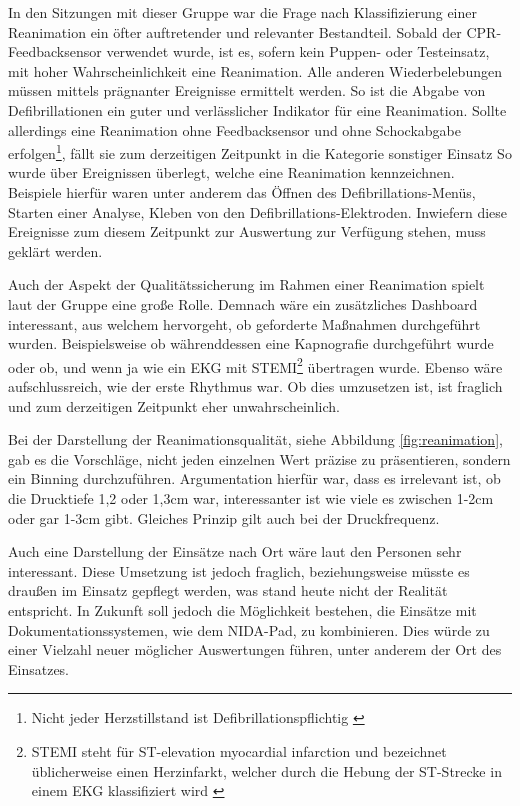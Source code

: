 In den Sitzungen mit dieser Gruppe war die Frage nach Klassifizierung einer Reanimation ein öfter auftretender und relevanter Bestandteil.
Sobald der \gls{CPR-Feedbacksensor} verwendet wurde, ist es, sofern kein Puppen- oder Testeinsatz, mit hoher Wahrscheinlichkeit eine Reanimation.
Alle anderen Wiederbelebungen müssen mittels prägnanter Ereignisse ermittelt werden. 
So ist die Abgabe von Defibrillationen ein guter und verlässlicher Indikator für eine Reanimation.
Sollte allerdings eine Reanimation ohne Feedbacksensor und ohne Schockabgabe erfolgen\footnote{Nicht jeder Herzstillstand ist Defibrillationspflichtig \cite{Nolan.2010}}, fällt sie zum derzeitigen Zeitpunkt in die Kategorie \glqq sonstiger Einsatz\grqq{}
So wurde über Ereignissen überlegt, welche eine Reanimation kennzeichnen.
Beispiele hierfür waren unter anderem das Öffnen des Defibrillations-Menüs, Starten einer Analyse, Kleben von den Defibrillations-Elektroden.
Inwiefern diese Ereignisse zum diesem Zeitpunkt zur Auswertung zur Verfügung stehen, muss geklärt werden. %

Auch der Aspekt der Qualitätssicherung im Rahmen einer Reanimation spielt laut der Gruppe eine große Rolle.
Demnach wäre ein zusätzliches Dashboard interessant, aus welchem hervorgeht, ob geforderte Maßnahmen durchgeführt wurden.
Beispielsweise ob währenddessen eine \gls{Kapnografie} durchgeführt wurde oder ob, und wenn ja wie ein EKG mit STEMI\footnote{STEMI steht für \glqq ST-elevation myocardial infarction\grqq{} und bezeichnet üblicherweise einen Herzinfarkt, welcher durch die Hebung der ST-Strecke in einem EKG klassifiziert wird \cite{Horacek.1998}} übertragen wurde.
Ebenso wäre aufschlussreich, wie der erste Rhythmus war. 
Ob dies umzusetzen ist, ist fraglich und zum derzeitigen Zeitpunkt eher unwahrscheinlich.

\label{par:binning}
Bei der Darstellung der Reanimationsqualität, siehe Abbildung \ref{fig:reanimation}, gab es die Vorschläge, nicht jeden einzelnen Wert präzise zu präsentieren, sondern ein \glqq \gls{Binning}\grqq{} durchzuführen.
Argumentation hierfür war, dass es irrelevant ist, ob die Drucktiefe 1,2 oder 1,3cm war, interessanter ist wie viele es zwischen 1-2cm oder gar 1-3cm gibt.
Gleiches Prinzip gilt auch bei der Druckfrequenz.

Auch eine Darstellung der Einsätze nach Ort wäre laut den Personen sehr interessant.
Diese Umsetzung ist jedoch fraglich, beziehungsweise müsste es draußen im Einsatz gepflegt werden, was stand heute nicht der Realität entspricht.
In Zukunft soll jedoch die Möglichkeit bestehen, die Einsätze mit Dokumentationssystemen, wie dem NIDA-Pad, zu kombinieren.
Dies würde zu einer Vielzahl neuer möglicher Auswertungen führen, unter anderem der Ort des Einsatzes.

